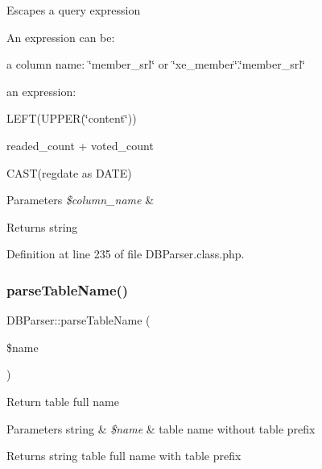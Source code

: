 Escapes a query expression

An expression can be\+: ~\newline
 
\begin{DoxyItemize}
\item a column name\+: \char`\"{}member\+\_\+srl\char`\"{} or \char`\"{}xe\+\_\+member\char`\"{}.\char`\"{}member\+\_\+srl\char`\"{} 
\item an expression\+: 
\begin{DoxyItemize}
\item L\+E\+FT(U\+P\+P\+ER(\char`\"{}content\char`\"{})) ~\newline
 
\item readed\+\_\+count + voted\+\_\+count ~\newline
 
\item C\+A\+S\+T(regdate as D\+A\+T\+E)  
\end{DoxyItemize}
\end{DoxyItemize}


\begin{DoxyParams}{Parameters}
{\em \$column\+\_\+name} & \\
\hline
\end{DoxyParams}
\begin{DoxyReturn}{Returns}
string 
\end{DoxyReturn}


Definition at line 235 of file D\+B\+Parser.\+class.\+php.

\hypertarget{classDBParser_ac4d949f99739a604bd7ee1ca7f14c946}{}\label{classDBParser_ac4d949f99739a604bd7ee1ca7f14c946} 
\subsubsection{\texorpdfstring{parse\+Table\+Name()}{parseTableName()}}
{\footnotesize\ttfamily D\+B\+Parser\+::parse\+Table\+Name (\begin{DoxyParamCaption}\item[{}]{\$name }\end{DoxyParamCaption})}

Return table full name


\begin{DoxyParams}[1]{Parameters}
string & {\em \$name} & table name without table prefix\\
\hline
\end{DoxyParams}
\begin{DoxyReturn}{Returns}
string table full name with table prefix 
\end{DoxyReturn}


